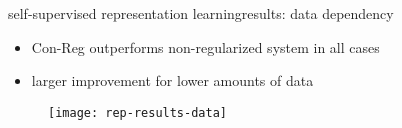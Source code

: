 \begin{frame}{self-supervised representation learning}{results: data dependency}
    \begin{itemize}
        \item   Con-Reg outperforms non-regularized system in all cases
        \item   larger improvement for lower amounts of data
    \end{itemize}
    \begin{figure}%
        \texttt{[image: rep-results-data]}
    \end{figure}
    
\end{frame}
 